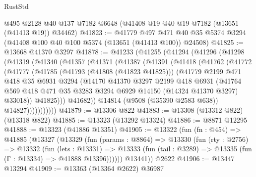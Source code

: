 \begin{lexlean}{RustStd}
\begin{coremodule}
    @495
    @2128
    @40
    @137
    @7182
    @6648
    (@41408 @19 @40 @19 @7182 (@13651 (@41413 @19)) @34462)
@41823 := @41779
    @497
    @471
    @40
    @35
    @5374
    @3294
    (@41408 @100 @40 @100 @5374 (@13651 (@41413 @100)) @24508)
@41825 := @13668 @41370 @3297
@41878 := @41233
    (@41255
      (@41294
        (@41296
          (@41298
            (@41319
              (@41340
                (@41357
                  (@41371
                    (@41387
                      (@41391
                        (@41418
                          (@41762
                            (@41772
                              (@41777
                                (@41785
                                  (@41793 (@41808 (@41823 @41825)))
                                  (@41779
                                    @2199
                                    @471
                                    @418
                                    @35
                                    @6931
                                    @3294
                                    (@14170
                                      @41370
                                      @3297
                                      @2199
                                      @418
                                      @6931
                                      (@41764
                                        @569
                                        @418
                                        @471
                                        @35
                                        @3283
                                        @3294
                                        @6929
                                        @14150
                                        (@14324 @41370 @3297)
                                        @33018))
                                    @41825)))
                              @41682))
                          @14814
                          (@9508 (@35390 @2583 @638))
                          @14827)))))))))))
@41879 := @13306 @822
@41883 := @13308 (@13312 @822) (@13318 @822)
@41885 := @13323 (@13292 @13324)
@41886 := @8871 @12295
@41888 := @13323 (@41886 @13351)
@41905 := @13322
    (fun (fn : @454) =>
    @41885
      (@13327
        (@13329
          (fun (params : @8864) =>
          @13330
            (fun (rty : @2756) =>
            @13332
              (fun (lets : @13331) =>
              @13333 (fun (tail : @3289) => @13335 (fun (Γ : @13334) => @41888 @13396))))))
        @13441))
    @2622
@41906 := @13447 @13294
@41909 := @13363 (@13364 @2622) @36987

\end{coremodule}
\end{lexlean}
